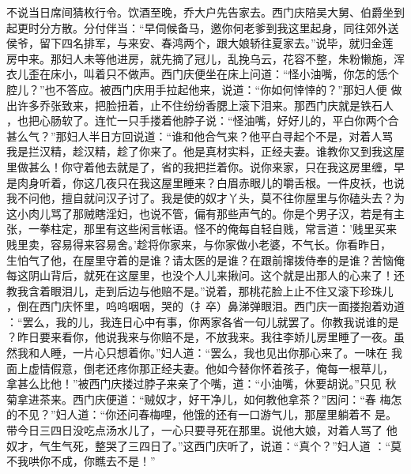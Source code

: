 不说当日席间猜枚行令。饮酒至晚，乔大户先告家去。西门庆陪吴大舅、伯爵坐到
起更时分方散。分付伴当：“早伺候备马，邀你何老爹到我这里起身，同往郊外送
侯爷，留下四名排军，与来安、春鸿两个，跟大娘轿往夏家去。”说毕，就归金莲
房中来。那妇人未等他进房，就先摘了冠儿，乱挽乌云，花容不整，朱粉懒施，浑
衣儿歪在床小，叫着只不做声。西门庆便坐在床上问道：“怪小油嘴，你怎的恁个
腔儿？”也不答应。被西门庆用手拉起他来，说道：“你如何悻悻的？”那妇人便
做出许多乔张致来，把脸扭着，止不住纷纷香腮上滚下泪来。那西门庆就是铁石人
，也把心肠软了。连忙一只手搂着他脖子说：“怪油嘴，好好儿的，平白你两个合
甚么气？”那妇人半日方回说道：“谁和他合气来？他平白寻起个不是，对着人骂
我是拦汉精，趁汉精，趁了你来了。他是真材实料，正经夫妻。谁教你又到我这屋
里做甚么！你守着他去就是了，省的我把拦着你。说你来家，只在我这房里缠，早
是肉身听着，你这几夜只在我这屋里睡来？白眉赤眼儿的嚼舌根。一件皮袄，也说
我不问他，擅自就问汉子讨了。我是使的奴才丫头，莫不往你屋里与你磕头去？为
这小肉儿骂了那贼瞎淫妇，也说不管，偏有那些声气的。你是个男子汉，若是有主
张，一拳柱定，那里有这些闲言帐语。怪不的俺每自轻自贱，常言道：'贱里买来
贱里卖，容易得来容易舍。'趁将你家来，与你家做小老婆，不气长。你看昨日，
生怕气了他，在屋里守着的是谁？请太医的是谁？在跟前撺拨侍奉的是谁？苦恼俺
每这阴山背后，就死在这屋里，也没个人儿来揪问。这个就是出那人的心来了！还
教我含着眼泪儿，走到后边与他赔不是。”说着，那桃花脸上止不住又滚下珍珠儿
，倒在西门庆怀里，呜呜咽咽，哭的（扌卒）鼻涕弹眼泪。西门庆一面搂抱着劝道
：“罢么，我的儿，我连日心中有事，你两家各省一句儿就罢了。你教我说谁的是
？昨日要来看你，他说我来与你赔不是，不放我来。我往李娇儿房里睡了一夜。虽
然我和人睡，一片心只想着你。”妇人道：“罢么，我也见出你那心来了。一味在
我面上虚情假意，倒老还疼你那正经夫妻。他如今替你怀着孩子，俺每一根草儿，
拿甚么比他！”被西门庆搂过脖子来亲了个嘴，道：“小油嘴，休要胡说。”只见
秋菊拿进茶来。西门庆便道：“贼奴才，好干净儿，如何教他拿茶？”因问：“春
梅怎的不见？”妇人道：“你还问春梅哩，他饿的还有一口游气儿，那屋里躺着不
是。带今日三四日没吃点汤水儿了，一心只要寻死在那里。说他大娘，对着人骂了
他奴才，气生气死，整哭了三四日了。”这西门庆听了，说道：“真个？”妇人道
：“莫不我哄你不成，你瞧去不是！”

